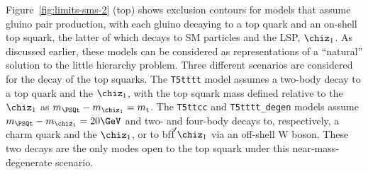 Figure~\ref{fig:limits-sms-2} (top) shows exclusion contours for
models that assume gluino pair production, with each gluino decaying
to a top quark and an on-shell top squark, the latter of which decays
to SM particles and the LSP, $\chiz_1$. As discussed earlier, these
models can be considered as representations of a ``natural'' solution
to the little hierarchy problem. Three different scenarios are
considered for the decay of the top squarks. The \texttt{T5tttt} model
assumes a two-body decay to a top quark and the $\chiz_1$, with the
top squark mass defined relative to the $\chiz_1$ as $m_{\PSQt} -
m_{\chiz_1} = m_\text{t}$. The \texttt{T5ttcc} and
\texttt{T5tttt\_degen} models assume $m_{\PSQt} - m_{\chiz_1} =
20\GeV$ and two- and four-body decays to, respectively, a charm quark
and the $\chiz_1$, or to bf$\bar{\text{f}}'\chiz_1$ via an off-shell W
boson. These two decays are the only modes open to the top squark
under this near-mass-degenerate scenario.

